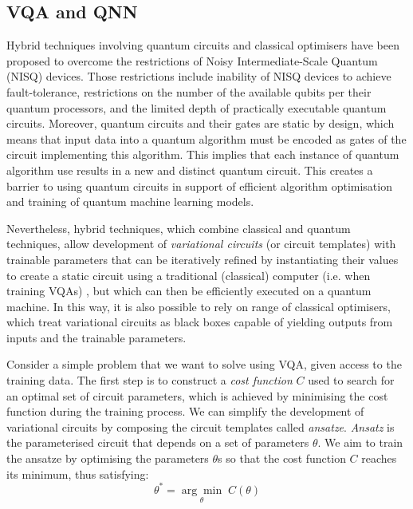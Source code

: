\subsection{VQA and QNN}
\label{VQA}

Hybrid techniques involving quantum circuits and classical optimisers have been proposed to overcome the restrictions of Noisy Intermediate-Scale Quantum (NISQ) \cite{brooksQuantumSupremacyHunt2019} devices.
Those restrictions include inability of NISQ devices to achieve fault-tolerance, restrictions on the number of the available qubits per their quantum processors, and the limited depth of practically executable quantum circuits.
Moreover, quantum circuits and their gates are static by design, which means that input data into a quantum algorithm must be encoded as gates of the circuit implementing this algorithm. This implies that each instance of quantum algorithm use results in a new and distinct quantum circuit. This creates a barrier to using quantum circuits in support of efficient algorithm optimisation and training of quantum machine learning models.

Nevertheless, hybrid techniques, which combine classical and quantum techniques, allow development of \emph{variational circuits} (or circuit templates) with trainable parameters that can be iteratively refined by instantiating their values to create a static circuit using a traditional (classical) computer (i.e. when training VQAs) \cite{cerezo2021variational}, but which can then be efficiently executed on a quantum machine.
In this way, it is also possible to rely on range of classical optimisers, which treat variational circuits as black boxes capable of yielding outputs from inputs and the trainable parameters.

Consider a simple problem that we want to solve using VQA, given access to the training data.
The first step is to construct a \textit{cost function} $C$ used to search for an optimal set of circuit parameters, which is achieved by minimising the cost function during the training process.
We can simplify the development of variational circuits by composing the circuit templates called \textit{ansatze}.
\textit{Ansatz} is the parameterised circuit that depends on a set of parameters $\theta$. We aim to train the ansatze by optimising the parameters $\theta$s so that the cost function $C$ reaches its minimum, thus satisfying:
\begin{equation}
    \theta^* = \underset{\theta}{\arg \min} \;C(\theta)
    \label{optimize theta with ansatz}
\end{equation}

